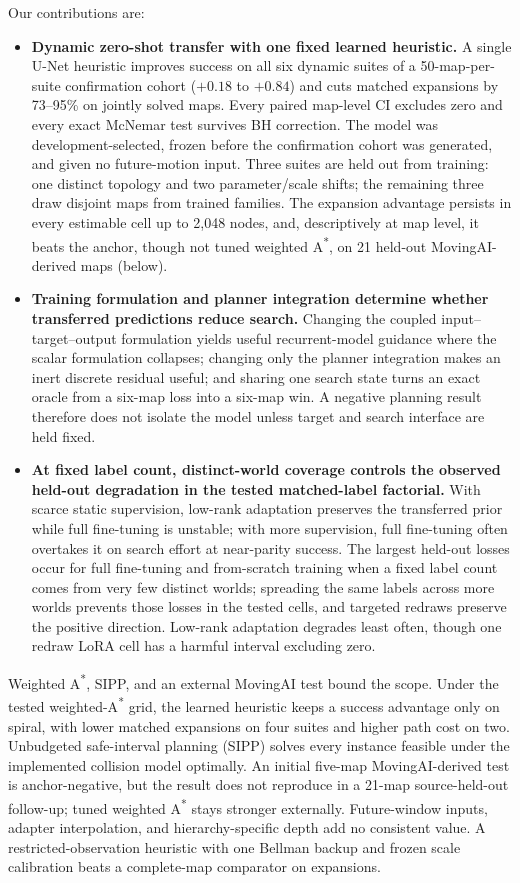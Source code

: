 \documentclass[letterpaper]{article} %
\begin{document}
Our contributions are:
\begin{itemize}
    \item \textbf{Dynamic zero-shot transfer with one fixed learned heuristic.} A single U-Net heuristic improves success on all six dynamic suites of a 50-map-per-suite confirmation cohort ($+0.18$ to $+0.84$) and cuts matched expansions by 73--95\% on jointly solved maps. Every paired map-level CI excludes zero and every exact McNemar test survives BH correction. The model was development-selected, frozen before the confirmation cohort was generated, and given no future-motion input. Three suites are held out from training: one distinct topology and two parameter/scale shifts; the remaining three draw disjoint maps from trained families. The expansion advantage persists in every estimable cell up to 2{,}048 nodes, and, descriptively at map level, it beats the anchor, though not tuned weighted A\textsuperscript{*}, on 21 held-out MovingAI-derived maps (below).
    \item \textbf{Training formulation and planner integration determine whether transferred predictions reduce search.} Changing the coupled input--target--output formulation yields useful recurrent-model guidance where the scalar formulation collapses; changing only the planner integration makes an inert discrete residual useful; and sharing one search state turns an exact oracle from a six-map loss into a six-map win. A negative planning result therefore does not isolate the model unless target and search interface are held fixed.
    \item \textbf{At fixed label count, distinct-world coverage controls the observed held-out degradation in the tested matched-label factorial.} With scarce static supervision, low-rank adaptation preserves the transferred prior while full fine-tuning is unstable; with more supervision, full fine-tuning often overtakes it on search effort at near-parity success. The largest held-out losses occur for full fine-tuning and from-scratch training when a fixed label count comes from very few distinct worlds; spreading the same labels across more worlds prevents those losses in the tested cells, and targeted redraws preserve the positive direction. Low-rank adaptation degrades least often, though one redraw LoRA cell has a harmful interval excluding zero.
\end{itemize}
Weighted A\textsuperscript{*}, SIPP, and an external MovingAI test bound the scope. Under the tested weighted-A\textsuperscript{*} grid, the learned heuristic keeps a success advantage only on spiral, with lower matched expansions on four suites and higher path cost on two. Unbudgeted safe-interval planning (SIPP) solves every instance feasible under the implemented collision model optimally. An initial five-map MovingAI-derived test is anchor-negative, but the result does not reproduce in a 21-map source-held-out follow-up; tuned weighted A\textsuperscript{*} stays stronger externally. Future-window inputs, adapter interpolation, and hierarchy-specific depth add no consistent value. A restricted-observation heuristic with one Bellman backup and frozen scale calibration beats a complete-map comparator on expansions.
\end{document}
